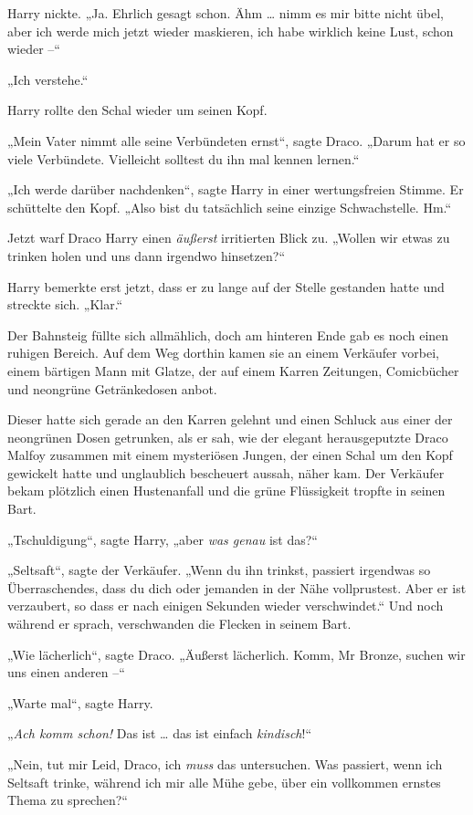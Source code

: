 {Harry nickte. „Ja. Ehrlich gesagt schon. Ähm … nimm es mir bitte nicht übel, aber ich werde mich jetzt wieder maskieren, ich habe wirklich keine Lust, schon wieder --“

„Ich verstehe.“

Harry rollte den Schal wieder um seinen Kopf.

„Mein Vater nimmt alle seine Verbündeten ernst“, sagte Draco. „Darum hat er so viele Verbündete. Vielleicht solltest du ihn mal kennen lernen.“

„Ich werde darüber nachdenken“, sagte Harry in einer wertungsfreien Stimme. Er schüttelte den Kopf. „Also bist du tatsächlich seine einzige Schwachstelle. Hm.“

Jetzt warf Draco Harry einen \emph{äußerst} irritierten Blick zu. „Wollen wir etwas zu trinken holen und uns dann irgendwo hinsetzen?“

Harry bemerkte erst jetzt, dass er zu lange auf der Stelle gestanden hatte und streckte sich. „Klar.“

Der Bahnsteig füllte sich allmählich, doch am hinteren Ende gab es noch einen ruhigen Bereich. Auf dem Weg dorthin kamen sie an einem Verkäufer vorbei, einem bärtigen Mann mit Glatze, der auf einem Karren Zeitungen, Comicbücher und neongrüne Getränkedosen anbot.

Dieser hatte sich gerade an den Karren gelehnt und einen Schluck aus einer der neongrünen Dosen getrunken, als er sah, wie der elegant herausgeputzte Draco Malfoy zusammen mit einem mysteriösen Jungen, der einen Schal um den Kopf gewickelt hatte und unglaublich bescheuert aussah, näher kam. Der Verkäufer bekam plötzlich einen Hustenanfall und die grüne Flüssigkeit tropfte in seinen Bart.

„Tschuldigung“, sagte Harry, „aber \emph{was genau} ist das?“

„Seltsaft“, sagte der Verkäufer. „Wenn du ihn trinkst, passiert irgendwas so Überraschendes, dass du dich oder jemanden in der Nähe vollprustest. Aber er ist verzaubert, so dass er nach einigen Sekunden wieder verschwindet.“ Und noch während er sprach, verschwanden die Flecken in seinem Bart.

„Wie lächerlich“, sagte Draco. „Äußerst lächerlich. Komm, Mr Bronze, suchen wir uns einen anderen --“

„Warte mal“, sagte Harry.

„\emph{Ach komm schon!} Das ist … das ist einfach \emph{kindisch}!“

„Nein, tut mir Leid, Draco, ich \emph{muss} das untersuchen. Was passiert, wenn ich Seltsaft trinke, während ich mir alle Mühe gebe, über ein vollkommen ernstes Thema zu sprechen?“

}
